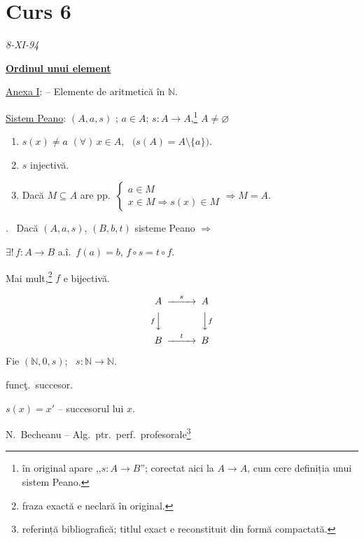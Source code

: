 \newpage
\section{Curs 6}


\begin{center}
\end{center}
\begin{flushright}
\textit{8-XI-94}
\end{flushright}

\bigskip
\noindent\underline{\textbf{Ordinul unui element}}

\bigskip
\noindent\underline{Anexa I}: -- Elemente de aritmetică în $\mathbb{N}$.

\bigskip
\noindent\underline{Sistem Peano}: $(A,a,s)$ ; $a\in A$; $s:A\to A$,\footnote{în original apare ,,$s:A\to B$''; corectat aici la $A\to A$, cum cere definiția unui sistem Peano.} $A\neq\varnothing$

\begin{enumerate}
\item[1)] $s(x)\neq a$ $(\forall)\,x\in A$, \ $\big(s(A)=A\setminus\{a\}\big)$.
\item[2)] $s$ injectivă.
\item[3)] Dacă $M\subseteq A$ are pp.\ $\begin{cases} a\in M \\ x\in M \Rightarrow s(x)\in M \end{cases} \Rightarrow M=A$.
\end{enumerate}

\bigskip
\noindent{}. \ Dacă $(A,a,s)$, $(B,b,t)$ sisteme Peano $\Rightarrow$

\noindent $\exists!\, f:A\to B$ a.î.\ $f(a)=b$, $f\circ s = t\circ f$.

\noindent Mai mult,\footnote{fraza exactă e neclară în original.} $f$ e bijectivă.

\[
\begin{CD}
A @>s>> A\\
@VfVV @VVfV\\
B @>t>> B
\end{CD}
\]

\bigskip
\noindent Fie $(\mathbb{N},0,s)$; \ $s:\mathbb{N}\to\mathbb{N}$.

\noindent funcţ.\ succesor.

\noindent $s(x)=x'$ -- succesorul lui $x$.

\bigskip
\noindent N.\ Becheanu -- Alg.\ ptr.\ perf.\ profesorale\footnote{referință bibliografică; titlul exact e reconstituit din formă compactată.}

